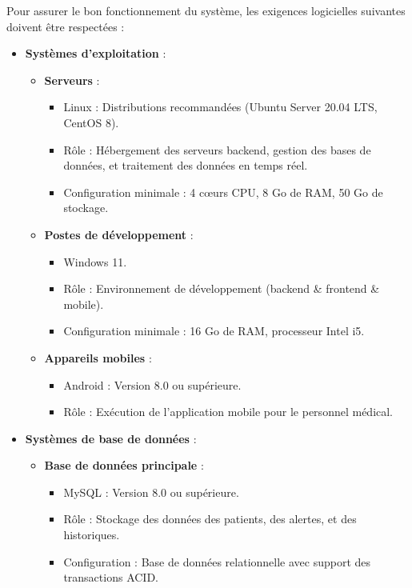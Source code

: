 Pour assurer le bon fonctionnement du système, les exigences logicielles suivantes doivent être respectées :

\begin{itemize}
    \item \textbf{Systèmes d'exploitation} :
    \begin{itemize}
        \item \textbf{Serveurs} :
            \begin{itemize}
                \item Linux : Distributions recommandées (Ubuntu Server 20.04 LTS, CentOS 8).
                \item Rôle : Hébergement des serveurs backend, gestion des bases de données, et traitement des données en temps réel.
                \item Configuration minimale : 4 cœurs CPU, 8 Go de RAM, 50 Go de stockage.
            \end{itemize}
        \item \textbf{Postes de développement} :
            \begin{itemize}
                \item Windows 11.
                \item Rôle : Environnement de développement (backend \& frontend \& mobile).
                \item Configuration minimale : 16 Go de RAM, processeur Intel i5.
            \end{itemize}
        \item \textbf{Appareils mobiles} :
            \begin{itemize}
                \item Android : Version 8.0 ou supérieure.
                \item Rôle : Exécution de l'application mobile pour le personnel médical.
            \end{itemize}
    \end{itemize}

    \item \textbf{Systèmes de base de données} :
    \begin{itemize}
        \item \textbf{Base de données principale} :
            \begin{itemize}
                \item MySQL : Version 8.0 ou supérieure.
                \item Rôle : Stockage des données des patients, des alertes, et des historiques.
                \item Configuration : Base de données relationnelle avec support des transactions ACID.
            \end{itemize}
    \end{itemize}


\end{itemize}
